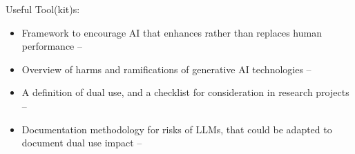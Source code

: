 \noindent Useful Tool(kit)s: 
\begin{itemize}
    \item Framework to encourage AI that enhances rather than replaces human performance -- \citet{shneiderman_human-centered_2020}
    \item Overview of harms and ramifications of generative AI technologies -- \citet{Solaiman_Evaluating_2024}
    \item A definition of dual use, and a checklist for consideration in research projects -- \citet{kaffee_thorny_2023}
    \item Documentation methodology for risks of LLMs, that could be adapted to document dual use impact -- \citet{derczynski_assessing_2023}
\end{itemize}
